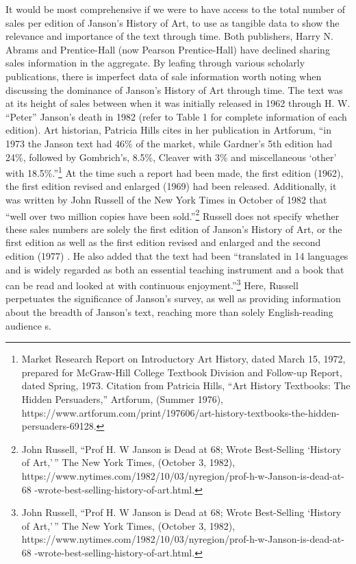 \documentclass[
  letterpaper,
  DIV=11,
  numbers=noendperiod]{scrreprt}
\begin{document}
It would be most comprehensive if we were to have access to the total
number of sales per edition of Janson's History of Art, to use as
tangible data to show the relevance and importance of the text through
time. Both publishers, Harry N. Abrams and Prentice-Hall (now Pearson
Prentice-Hall) have declined sharing sales information in the aggregate.
By leafing through various scholarly publications, there is imperfect
data of sale information worth noting when discussing the dominance of
Janson's History of Art through time. The text was at its height of
sales between when it was initially released in 1962 through H. W.
``Peter'' Janson's death in 1982 (refer to Table 1 for complete
information of each edition). Art historian, Patricia Hills cites in her
publication in Artforum, ``in 1973 the Janson text had 46\% of the
market, while Gardner's 5th edition had 24\%, followed by Gombrich's,
8.5\%, Cleaver with 3\% and miscellaneous `other' with
18.5\%.''\footnote{Market Research Report on Introductory Art History,
  dated March 15, 1972, prepared for McGraw-Hill College Textbook
  Division and Follow-up Report, dated Spring, 1973. Citation from
  Patricia Hills, ``Art History Textbooks: The Hidden Persuaders,''
  Artforum, (Summer 1976),
  https://www.artforum.com/print/197606/art-history-textbooks-the-hidden-persuaders-69128.}
At the time such a report had been made, the first edition (1962), the
first edition revised and enlarged (1969) had been released.
Additionally, it was written by John Russell of the New York Times in
October of 1982 that ``well over two million copies have been
sold.''\footnote{John Russell, ``Prof H. W Janson is Dead at 68; Wrote
  Best-Selling `History of Art,'\,'' The New York Times, (October 3,
  1982),
  https://www.nytimes.com/1982/10/03/nyregion/prof-h-w-Janson-is-dead-at-68
  -wrote-best-selling-history-of-art.html.} Russell does not specify
whether these sales numbers are solely the first edition of Janson's
History of Art, or the first edition as well as the first edition
revised and enlarged and the second edition (1977) . He also added that
the text had been ``translated in 14 languages and is widely regarded as
both an essential teaching instrument and a book that can be read and
looked at with continuous enjoyment.''\footnote{John Russell, ``Prof H.
  W Janson is Dead at 68; Wrote Best-Selling `History of Art,'\,'' The
  New York Times, (October 3, 1982),
  https://www.nytimes.com/1982/10/03/nyregion/prof-h-w-Janson-is-dead-at-68
  -wrote-best-selling-history-of-art.html.} Here, Russell perpetuates
the significance of Janson's survey, as well as providing information
about the breadth of Janson's text, reaching more than solely
English-reading audience s.
\end{document}
